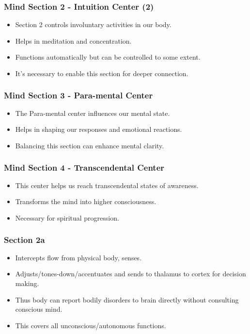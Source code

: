 \begin{frame}[fragile]\frametitle{Mind Section 2 - Intuition Center (2)}
\begin{itemize}
    \item Section 2 controls involuntary activities in our body.
    \item Helps in meditation and concentration.
    \item Functions automatically but can be controlled to some extent.
    \item It’s necessary to enable this section for deeper connection.
\end{itemize}
\end{frame}

\begin{frame}[fragile]\frametitle{Mind Section 3 - Para-mental Center}
\begin{itemize}
    \item The Para-mental center influences our mental state.
    \item Helps in shaping our responses and emotional reactions.
    \item Balancing this section can enhance mental clarity.
\end{itemize}
\end{frame}

\begin{frame}[fragile]\frametitle{Mind Section 4 - Transcendental Center}
\begin{itemize}
    \item This center helps us reach transcendental states of awareness.
    \item Transforms the mind into higher consciousness.
    \item Necessary for spiritual progression.
\end{itemize}
\end{frame}


\begin{frame}[fragile]
\frametitle{Section 2a}
\begin{itemize}
\item Intercepts flow from physical body, senses.
\item Adjusts/tones-down/accentuates and sends to thalamus to cortex for decision making.
\item Thus body can report bodily disorders to brain directly without consulting conscious mind.
\item This covers all unconscious/autonomous functions.
\end{itemize}
\end{frame}

